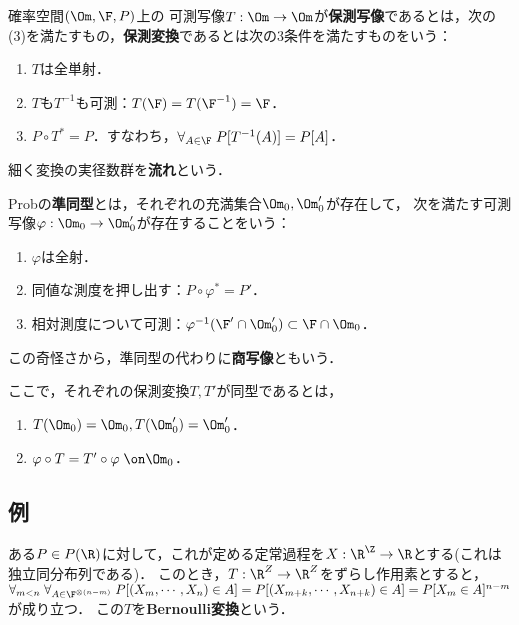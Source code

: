 \documentclass[uplatex,dvipdfmx]{jsreport}
\begin{document}
\begin{definition}
    確率空間$(\Om,\F,P)$上の
    可測写像$T:\Om\to\Om$が\textbf{保測写像}であるとは，次の(3)を満たすもの，\textbf{保測変換}であるとは次の3条件を満たすものをいう：
    \begin{enumerate}
        \item $T$は全単射．
        \item $T$も$T^{-1}$も可測：$T(\F)=T(\F^{-1})=\F$．
        \item $P\circ T^*=P$．すなわち，$\forall_{A\in\F}\;P[T^{-1}(A)]=P[A]$．
    \end{enumerate}
    細く変換の実径数群を\textbf{流れ}という．
\end{definition}

\begin{definition}
    Probの\textbf{準同型}とは，それぞれの充満集合$\Om_0,\Om'_0$が存在して，
    次を満たす可測写像$\varphi:\Om_0\to\Om'_0$が存在することをいう：
    \begin{enumerate}
        \item $\varphi$は全射．
        \item 同値な測度を押し出す：$P\circ\varphi^*=P'$．
        \item 相対測度について可測：$\varphi^{-1}(\F'\cap\Om_0')\subset\F\cap\Om_0$．
    \end{enumerate}
    この奇怪さから，準同型の代わりに\textbf{商写像}ともいう．
\end{definition}

\begin{definition}[射の同型]
    ここで，それぞれの保測変換$T,T'$が同型であるとは，
    \begin{enumerate}
        \item $T(\Om_0)=\Om_0,T(\Om_0')=\Om_0'$．
        \item $\varphi\circ T=T'\circ\varphi\;\on\Om_0$．
    \end{enumerate}
\end{definition}

\subsection{例}

\begin{example}
    ある$P\in P(\R)$に対して，これが定める定常過程を$X:\R^\Z\to\R$とする(これは独立同分布列である)．
    このとき，$T:\R^Z\to\R^Z$をずらし作用素とすると，$\forall_{m<n}\;\forall_{A\in\F^{\otimes(n-m)}}\;P[(X_m,\cdots,X_n)\in A]=P[(X_{m+k},\cdots,X_{n+k})\in A]=P[X_m\in A]^{n-m}$が成り立つ．
    この$T$を\textbf{Bernoulli変換}という．
\end{example}
\end{document}
